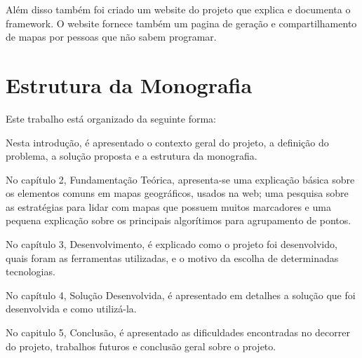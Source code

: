 Além disso também foi criado um website do projeto\cite{gitsite} que explica e documenta o framework. O website fornece também um pagina de geração e compartilhamento de mapas por pessoas que não sabem programar.

\section{Estrutura da Monografia}
Este trabalho está organizado da seguinte forma:

Nesta introdução, é apresentado o contexto geral do projeto, a definição do problema, a solução proposta e a estrutura da monografia.

No capítulo 2, Fundamentação Teórica, apresenta-se uma explicação básica sobre os elementos comuns em mapas geográficos, usados na web; uma pesquisa sobre as estratégias para lidar com mapas que possuem muitos marcadores e uma pequena explicação sobre os principais algorítimos para agrupamento de pontos.

No capítulo 3, Desenvolvimento, é explicado como o projeto foi desenvolvido, quais foram as ferramentas utilizadas, e o motivo da escolha de determinadas tecnologias. 

No capítulo 4, Solução Desenvolvida, é apresentado em detalhes a solução que foi desenvolvida e como utilizá-la.

No capitulo 5, Conclusão, é apresentado as dificuldades encontradas no decorrer do projeto, trabalhos futuros e conclusão geral sobre o projeto.



